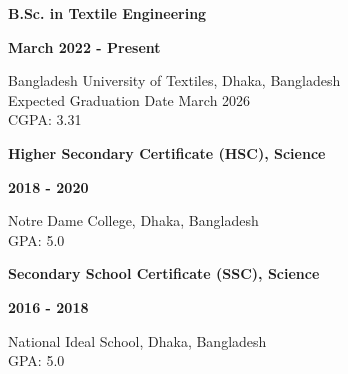 \noindent
\begin{minipage}[t]{0.50\textwidth}
    \raggedright
    {\fontsize{12pt}{15pt}\bfseries B.Sc. in Textile Engineering}
\end{minipage}%
\hfill
\begin{minipage}[t]{0.50\textwidth}
    \raggedleft
    {\fontsize{12pt}{15pt}\bfseries March 2022 - Present}
\end{minipage}
Bangladesh University of Textiles, Dhaka, Bangladesh\\
Expected Graduation Date March 2026\\
CGPA: 3.31\par
\vspace{0.3em}

\noindent
\begin{minipage}[t]{0.50\textwidth}
    \raggedright
    {\fontsize{12pt}{15pt}\bfseries Higher Secondary Certificate (HSC), Science}
\end{minipage}%
\hfill
\begin{minipage}[t]{0.50\textwidth}
    \raggedleft
    {\fontsize{12pt}{15pt}\bfseries 2018 - 2020}
\end{minipage}
Notre Dame College, Dhaka, Bangladesh\\
GPA: 5.0\par
\vspace{0.3em}

\noindent
\begin{minipage}[t]{0.50\textwidth}
    \raggedright
    {\fontsize{12pt}{15pt}\bfseries Secondary School Certificate (SSC), Science}
\end{minipage}%
\hfill
\begin{minipage}[t]{0.50\textwidth}
    \raggedleft
    {\fontsize{12pt}{15pt}\bfseries 2016 - 2018}
\end{minipage}
National Ideal School, Dhaka, Bangladesh\\
GPA: 5.0\par
\vspace{0.3em}
